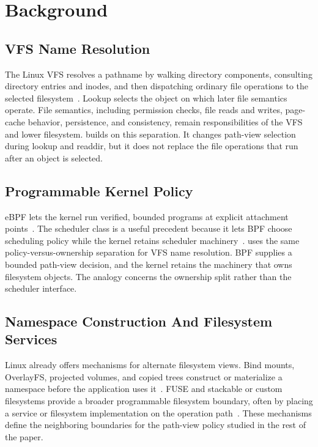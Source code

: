 \section{Background}
\label{sec:background}

\subsection{VFS Name Resolution}

The Linux VFS resolves a pathname by walking directory components, consulting
directory entries and inodes, and then dispatching ordinary file operations to
the selected filesystem~\cite{linux_vfs_docs,linux_path_lookup}. Lookup selects the object on which later file
semantics operate. File semantics, including permission checks, file reads and
writes, page-cache behavior, persistence, and consistency, remain
responsibilities of the VFS and lower filesystem. \namei builds on this
separation. It changes path-view selection during lookup and readdir, but it
does not replace the file operations that run after an object is selected.

\subsection{Programmable Kernel Policy}

eBPF lets the kernel run verified, bounded programs at explicit attachment
points~\cite{linux_bpf_docs,linux_bpf_verifier}. The  scheduler class is a useful precedent because it
lets BPF choose scheduling policy while the kernel retains scheduler
machinery~\cite{linux_sched_ext}. \namei uses the same policy-versus-ownership
separation for VFS name resolution. BPF supplies a bounded path-view decision,
and the kernel retains the machinery that owns filesystem objects. The analogy
concerns the ownership split rather than the scheduler interface.

\subsection{Namespace Construction And Filesystem Services}

Linux already offers mechanisms for alternate filesystem views. Bind mounts,
OverlayFS, projected volumes, and copied trees construct or materialize a
namespace before the application uses it~\cite{linux_mount,linux_overlayfs,kubernetes_projected_volumes}.
FUSE and stackable or custom filesystems provide a broader programmable
filesystem boundary, often by placing a service or filesystem implementation on
the operation path~\cite{linux_fuse,wrapfs,bento}. These mechanisms define the neighboring
boundaries for the path-view policy studied in the rest of the paper.

